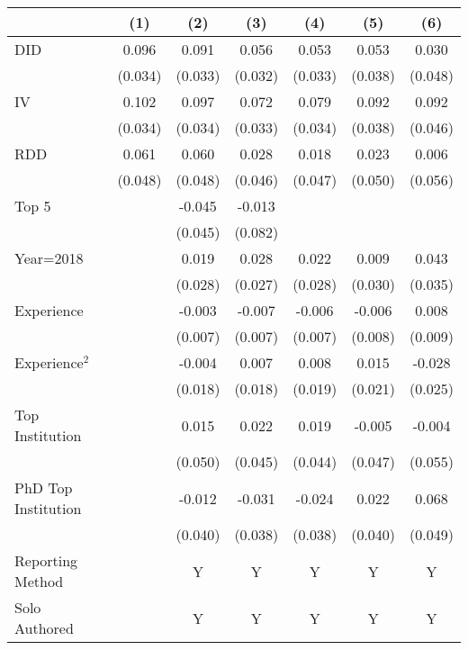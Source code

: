 \begin{tabular}{l*{6}{c}}
\hline\hline
                &\multicolumn{1}{c}{(1)}&\multicolumn{1}{c}{(2)}&\multicolumn{1}{c}{(3)}&\multicolumn{1}{c}{(4)}&\multicolumn{1}{c}{(5)}&\multicolumn{1}{c}{(6)}\\
\hline
DID             &    0.096&    0.091&    0.056&    0.053&    0.053&    0.030\\
                &  (0.034)&  (0.033)&  (0.032)&  (0.033)&  (0.038)&  (0.048)\\
IV              &    0.102&    0.097&    0.072&    0.079&    0.092&    0.092\\
                &  (0.034)&  (0.034)&  (0.033)&  (0.034)&  (0.038)&  (0.046)\\
RDD             &    0.061&    0.060&    0.028&    0.018&    0.023&    0.006\\
                &  (0.048)&  (0.048)&  (0.046)&  (0.047)&  (0.050)&  (0.056)\\
Top 5           &         &   -0.045&   -0.013&         &         &         \\
                &         &  (0.045)&  (0.082)&         &         &         \\
Year=2018       &         &    0.019&    0.028&    0.022&    0.009&    0.043\\
                &         &  (0.028)&  (0.027)&  (0.028)&  (0.030)&  (0.035)\\
Experience      &         &   -0.003&   -0.007&   -0.006&   -0.006&    0.008\\
                &         &  (0.007)&  (0.007)&  (0.007)&  (0.008)&  (0.009)\\
Experience$^2$  &         &   -0.004&    0.007&    0.008&    0.015&   -0.028\\
                &         &  (0.018)&  (0.018)&  (0.019)&  (0.021)&  (0.025)\\
Top Institution &         &    0.015&    0.022&    0.019&   -0.005&   -0.004\\
                &         &  (0.050)&  (0.045)&  (0.044)&  (0.047)&  (0.055)\\
PhD Top Institution&         &   -0.012&   -0.031&   -0.024&    0.022&    0.068\\
                &         &  (0.040)&  (0.038)&  (0.038)&  (0.040)&  (0.049)\\
Reporting Method &         &        Y&        Y&        Y&        Y&        Y\\
Solo Authored   &         &        Y&        Y&        Y&        Y&        Y\\

\end{tabular}
